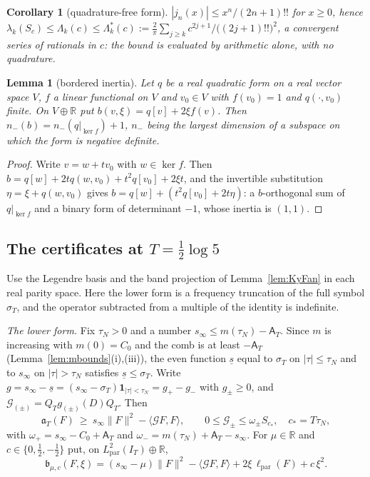 \documentclass[11pt]{amsart}
\newtheorem{lemma}[theorem]{Lemma}
\newtheorem{corollary}[theorem]{Corollary}
\theoremstyle{definition}
\theoremstyle{remark}
\newcommand{\R}{\mathbb R}
\newcommand{\IT}{I_T}
\newcommand{\sT}{\sigma_T}
\newcommand{\Aconst}{\mathsf A_T}
\begin{document}
\begin{corollary}[quadrature-free form]\label{cor:P1}
$|j_n(x)|\le x^n/(2n+1)!!$ for $x\ge0$, hence
$\lambda_k(S_c)\le\Lambda_k(c)\le\Lambda^*_k(c):=\frac2\pi\sum_{j\ge k}c^{2j+1}/\big((2j+1)!!\big)^2$, a convergent
series of rationals in $c$: the bound is evaluated by arithmetic alone, with no quadrature.
\end{corollary}


\begin{lemma}[bordered inertia]\label{lem:border}
Let $q$ be a real quadratic form on a real vector space $V$, $f$ a linear functional on
$V$ and $v_0\in V$ with $f(v_0)=1$ and $q(\cdot,v_0)$ finite. On $V\oplus\R$ put
$b(v,\xi)=q[v]+2\xi f(v)$. Then $n_-(b)=n_-(q|_{\ker f})+1$, $n_-$ being the largest dimension of a
subspace on which the form is negative definite.
\end{lemma}
\begin{proof}
Write $v=w+tv_0$ with $w\in\ker f$. Then $b=q[w]+2tq(w,v_0)+t^2q[v_0]+2\xi t$, and the invertible
substitution $\eta=\xi+q(w,v_0)$ gives $b=q[w]+(t^2q[v_0]+2t\eta)$: a $b$-orthogonal sum of
$q|_{\ker f}$ and a binary form of determinant $-1$, whose inertia is $(1,1)$.
\end{proof}

\subsection{The certificates at \texorpdfstring{$T=\frac12\log5$}{T = (1/2) log 5}}\label{subsec:encllog5}
Use the Legendre basis and the band projection of Lemma~\ref{lem:KyFan} in each real parity space. Here the lower form is a frequency truncation of the full symbol $\sT$, and the operator subtracted from a
multiple of the identity is indefinite.

\emph{The lower form.} Fix $\tau_N>0$ and a number $s_\infty\le m(\tau_N)-\Aconst$. Since $m$ is increasing
with $m(0)=C_0$ and the comb is at least $-\Aconst$ (Lemma~\ref{lem:mbounds}(i),(iii)), the even function
$\underline s$ equal to $\sT$ on $|\tau|\le\tau_N$ and to $s_\infty$ on $|\tau|>\tau_N$ satisfies
$\underline s\le\sT$. Write $g=s_\infty-\underline s=(s_\infty-\sT)\mathbf 1_{|\tau|<\tau_N}=g_+-g_-$ with
$g_\pm\ge0$, and $\mathcal G_{(\pm)}=Q_Tg_{(\pm)}(D)Q_T$. Then
\[
\mathfrak a_T(F)\ \ge\ s_\infty\|F\|^2-\langle\mathcal GF,F\rangle,\qquad
0\le\mathcal G_\pm\le\omega_\pm S_{c_*},\quad c_*=T\tau_N,
\]
with $\omega_+=s_\infty-C_0+\Aconst$ and $\omega_-=m(\tau_N)+\Aconst-s_\infty$. For $\mu\in\R$ and
$c\in\{0,\frac12,-\frac12\}$ put, on $L^2_{\mathrm{par}}(\IT)\oplus\R$,
\[
\mathfrak b_{\mu,c}(F,\xi)=(s_\infty-\mu)\|F\|^2-\langle\mathcal GF,F\rangle+2\xi\,\ell_{\mathrm{par}}(F)+c\,\xi^2 .
\]
\end{document}
